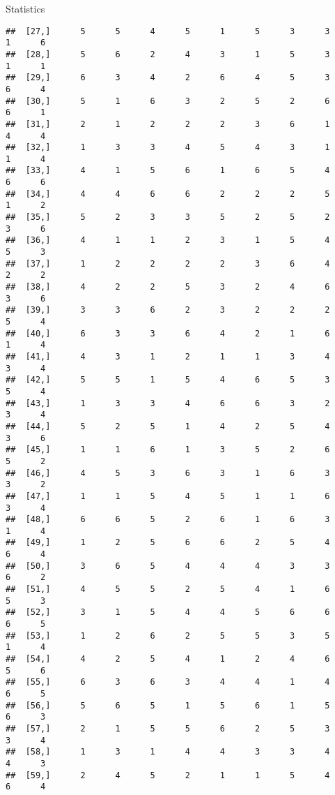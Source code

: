 \documentclass[
  ignorenonframetext,
]{beamer}
\begin{document}
\begin{frame}[fragile]{Statistics}
\begin{verbatim}
##  [27,]      5      5      4      5      1      5      3      3      1      6
##  [28,]      5      6      2      4      3      1      5      3      1      1
##  [29,]      6      3      4      2      6      4      5      3      6      4
##  [30,]      5      1      6      3      2      5      2      6      6      1
##  [31,]      2      1      2      2      2      3      6      1      4      4
##  [32,]      1      3      3      4      5      4      3      1      1      4
##  [33,]      4      1      5      6      1      6      5      4      6      6
##  [34,]      4      4      6      6      2      2      2      5      1      2
##  [35,]      5      2      3      3      5      2      5      2      3      6
##  [36,]      4      1      1      2      3      1      5      4      5      3
##  [37,]      1      2      2      2      2      3      6      4      2      2
##  [38,]      4      2      2      5      3      2      4      6      3      6
##  [39,]      3      3      6      2      3      2      2      2      5      4
##  [40,]      6      3      3      6      4      2      1      6      1      4
##  [41,]      4      3      1      2      1      1      3      4      3      4
##  [42,]      5      5      1      5      4      6      5      3      5      4
##  [43,]      1      3      3      4      6      6      3      2      3      4
##  [44,]      5      2      5      1      4      2      5      4      3      6
##  [45,]      1      1      6      1      3      5      2      6      5      2
##  [46,]      4      5      3      6      3      1      6      3      3      2
##  [47,]      1      1      5      4      5      1      1      6      3      4
##  [48,]      6      6      5      2      6      1      6      3      1      4
##  [49,]      1      2      5      6      6      2      5      4      6      4
##  [50,]      3      6      5      4      4      4      3      3      6      2
##  [51,]      4      5      5      2      5      4      1      6      5      3
##  [52,]      3      1      5      4      4      5      6      6      6      5
##  [53,]      1      2      6      2      5      5      3      5      1      4
##  [54,]      4      2      5      4      1      2      4      6      5      6
##  [55,]      6      3      6      3      4      4      1      4      6      5
##  [56,]      5      6      5      1      5      6      1      5      6      3
##  [57,]      2      1      5      5      6      2      5      3      3      4
##  [58,]      1      3      1      4      4      3      3      4      4      3
##  [59,]      2      4      5      2      1      1      5      4      6      4

\end{verbatim}
\end{frame}
\end{document}
